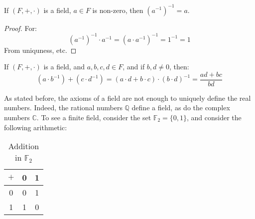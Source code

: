 \documentclass[crop=false,class=book,oneside]{standalone}
\begin{document}
            \begin{theorem}
                If $(F,+,\cdot)$ is a field, $a\in{F}$ is non-zero,
                then $(a^{\minus{1}})^{\minus{1}}=a$.
            \end{theorem}
            \begin{proof}
                For:
                \begin{equation}
                    (a^{\minus{1}})^{\minus{1}}\cdot{a}^{\minus{1}}=
                    (a\cdot{a}^{\minus{1}})^{\minus{1}}=
                    1^{\minus{1}}=1
                \end{equation}
                From uniquness, etc.
            \end{proof}
            \begin{theorem}
                If $(F,+,\cdot)$ is a field, and $a,b,c,d\in{F}$, and
                if $b,d\ne{0}$, then:
                \begin{equation}
                    (a\cdot{b}^{\minus{1}})+(c\cdot{d}^{\minus{1}})=
                    (a\cdot{d}+b\cdot{c})\cdot(b\cdot{d})^{\minus{1}}
                    =\frac{ad+bc}{bd}
                \end{equation}
            \end{theorem}
            As stated before, the axioms of a field are not enough
            to uniquely define the real numbers. Indeed, the rational
            numbers $\mathbb{Q}$ define a field, as do the complex
            numbers $\mathbb{C}$. To see a finite field, consider the
            set $\mathbb{F}_{2}=\{0,1\}$, and consider the following
            arithmetic:
            \par
            \begin{minipage}[b]{0.49\textwidth}
                \centering
                \begin{table}[H]
                    \centering
                    \captionsetup{type=table}
                    \begin{tabular}{c|cc}
                        $+$&0&1\\
                        \hline
                        0&0&1\\
                        1&1&0
                    \end{tabular}
                    \caption{Addition in $\mathbb{F}_{2}$}
                    \label{tab:Real_Analysis_Add_in_F_2_Field}
                \end{table}
            \end{minipage}
\end{document}
